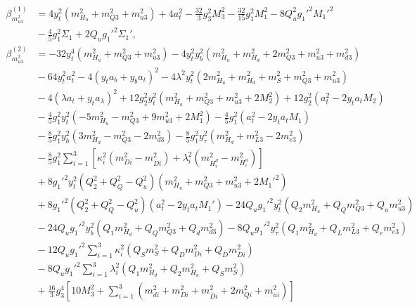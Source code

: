 \documentclass[preprint,amsmath,amssymb,aps,superscriptaddress,prd,showpacs,floatfix,nofootinbib]{revtex4-1}
\begin{document}
\begin{subequations}
\begin{align}
\beta_{m_{u3}^2}^{(1)}&=4y_t^2\left ( m_{H_u}^2+m_{Q3}^2+m_{u3}^2\right )+4a_t^2-\frac{32}{3}g_3^2M_3^2-\frac{32}{15}g_1^2M_1^2-8Q_u^2g_1'^2M_1'^2\nonumber\\
&{}-\frac{4}{5}g_1^2\Sigma_1+2Q_ug_1'^2\Sigma_1',\label{eq:USSMmu222BetaOneLoop}\\
\beta_{m_{u3}^2}^{(2)}&=-32y_t^4\left ( m_{H_u}^2+m_{Q3}^2+m_{u3}^2\right )-4y_t^2y_b^2\left ( m_{H_u}^2+m_{H_d}^2+2m_{Q3}^2+m_{u3}^2+m_{d3}^2\right )\nonumber\\
&{}-64y_t^2a_t^2-4\left ( y_ta_b+y_ba_t\right )^2-4\lambda^2y_t^2\left ( 2m_{H_u}^2+m_{H_d}^2+m_S^2+m_{Q3}^2+m_{u3}^2\right )\nonumber\\
&{}-4\left ( \lambda a_t + y_ta_\lambda \right )^2+12g_2^2y_t^2\left ( m_{H_u}^2+m_{Q3}^2+m_{u3}^2+2M_2^2\right )+12g_2^2\left ( a_t^2-2y_ta_tM_2\right )\nonumber\\
&{}-\frac{4}{5}g_1^2y_t^2\left ( -5m_{H_u}^2-m_{Q3}^2+9m_{u3}^2+2M_1^2\right )-\frac{4}{5}g_1^2\left ( a_t^2-2y_ta_tM_1 \right )\nonumber\\
&{}-\frac{8}{5}g_1^2y_b^2\left ( 3m_{H_d}^2-m_{Q3}^2-2m_{d3}^2\right )-\frac{8}{5}g_1^2y_\tau^2\left ( m_{H_d}^2+m_{L3}^2-2m_{e3}^2\right )\nonumber\\
&{}-\frac{8}{5}g_1^2\sum_{i=1}^3\left [ \kappa_i^2\left ( m_{Di}^2-m_{\overline{D}i}^2 \right )+\lambda_i^2\left ( m_{H_i^d}^2-m_{H_i^u}^2 \right )\right ]\nonumber\\
&{}+8g_1'^2y_t^2\left ( Q_2^2+Q_Q^2-Q_u^2\right )\left ( m_{H_u}^2+m_{Q3}^2+m_{u3}^2+2M_1'^2\right )\nonumber\\
&{}+8g_1'^2\left ( Q_2^2+Q_Q^2-Q_u^2\right )\left ( a_t^2-2y_ta_tM_1'\right )-24Q_ug_1'^2y_t^2\left (Q_2m_{H_u}^2+Q_Qm_{Q3}^2+Q_um_{u3}^2\right )\nonumber\\
&{}-24Q_ug_1'^2y_b^2\left ( Q_1m_{H_d}^2+Q_Qm_{Q3}^2+Q_dm_{d3}^2\right )-8Q_ug_1'^2y_\tau^2\left ( Q_1m_{H_d}^2+Q_Lm_{L3}^2+Q_em_{e3}^2\right )\nonumber\\
&{}-12Q_ug_1'^2\sum_{i=1}^3\kappa_i^2\left ( Q_Sm_S^2+Q_Dm_{Di}^2+Q_{\overline{D}}m_{\overline{D}i}^2\right )\nonumber\\
&{}-8Q_ug_1'^2\sum_{i=1}^3\lambda_i^2\left ( Q_1m_{H_d}^2+Q_2m_{H_u}^2+Q_Sm_S^2\right )\nonumber\\
&{}+\frac{16}{3}g_3^4\left [ 10M_3^2+\sum_{i=1}^3\left ( m_{di}^2+m_{Di}^2+m_{\overline{D}i}^2+2m_{Qi}^2+m_{ui}^2\right )\right ]\nonumber\\

\end{align}
\end{subequations}
\end{document}
